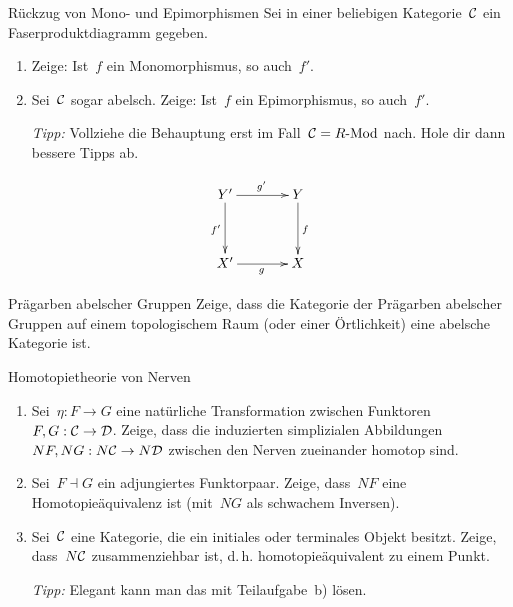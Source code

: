 \documentclass{uebblatt}
\begin{document}

\begin{aufgabe}{Rückzug von Mono- und Epimorphismen}
Sei in einer beliebigen Kategorie~$\mathcal{C}$ ein Faserproduktdiagramm gegeben.
\begin{enumerate}
\item Zeige: Ist~$f$ ein Monomorphismus, so auch~$f'$.
\item Sei~$\mathcal{C}$ sogar abelsch. Zeige: Ist~$f$ ein Epimorphismus, so auch~$f'$.

\emph{Tipp:} Vollziehe die Behauptung erst im Fall~$\mathcal{C} = R\text{-}\mathrm{Mod}$ nach. Hole
dir dann bessere Tipps ab.
\end{enumerate}
\[ \xymatrixcolsep{3pc}\xymatrixrowsep{3pc}\xymatrix{
  Y' \ar[r]^{g'} \ar[d]_{f'} & Y \ar[d]^f \\
  X' \ar[r]_g & X
} \]
\end{aufgabe}

\newpage

\begin{aufgabe}{Prägarben abelscher Gruppen}
Zeige, dass die Kategorie der Prägarben abelscher Gruppen auf einem
topologischem Raum (oder einer Örtlichkeit) eine abelsche Kategorie ist.
\end{aufgabe}

\begin{aufgabe}{Homotopietheorie von Nerven}
\begin{enumerate}
\item Sei~$\eta : F \to G$ eine natürliche Transformation zwischen
Funktoren~$F,G : \mathcal{C} \to \mathcal{D}$. Zeige, dass die induzierten simplizialen
Abbildungen~$NF, NG : N\mathcal{C} \to N\mathcal{D}$ zwischen den Nerven zueinander homotop
sind.
\item Sei~$F \dashv G$ ein adjungiertes Funktorpaar. Zeige, dass~$NF$ eine
Homotopieäquivalenz ist (mit~$NG$ als schwachem Inversen).
\item Sei~$\mathcal{C}$ eine Kategorie, die ein initiales oder terminales Objekt
besitzt. Zeige, dass~$N\mathcal{C}$ zusammenziehbar ist, d.\,h. homotopieäquivalent zu
einem Punkt.

\emph{Tipp:} Elegant kann man das mit Teilaufgabe~b) lösen.
\end{enumerate}
\end{aufgabe}
\end{document}
